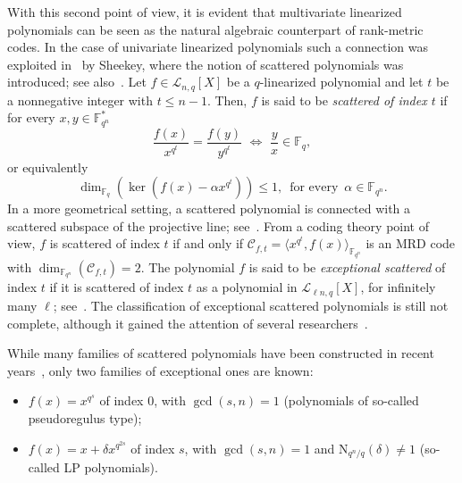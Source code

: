 With this second point of view, it is evident that multivariate linearized polynomials can be seen as the natural algebraic counterpart of rank-metric codes. In the case of univariate linearized polynomials such a connection was exploited in~\cite{sheekey2016new} by Sheekey, where the notion of scattered polynomials was introduced; see also~\cite{bartoli2018exceptional}. Let $f \in \mathcal{L}_{n,q}[X]$ be a $q$-linearized polynomial and let $t$ be a nonnegative integer with $t\leq n-1$. Then, $f$ is said to be \emph{scattered of index $t$} if for every $x,y \in \mathbb{F}_{q^n}^*$
\[ \frac{f(x)}{x^{q^t}}=\frac{f(y)}{y^{q^t}}\,\, \Longleftrightarrow\,\, \frac{y}x\in \mathbb{F}_q, \]
or equivalently
\begin{equation*} \dim_{\mathbb{F}_q}(\ker(f(x)-\alpha x^{q^t}))\leq 1, \,\,\,\text{for every}\,\,\, \alpha \in \mathbb{F}_{q^n}. \end{equation*}
In a more geometrical setting, a scattered polynomial is connected with a scattered subspace of the projective line; see~\cite{blokhuis2000scattered}. From a coding theory point of view,  $f$ is scattered of index $t$ if and only if $\mathcal{C}_{f,t}=\langle x^{q^t}, f(x) \rangle_{\mathbb{F}_{q^n}}$ is an MRD code with $\dim_{\mathbb{F}_{q^n}}(\mathcal{C}_{f,t})=2$.
The polynomial $f$ is said to be \emph{exceptional scattered} of index $t$ if it is scattered of index $t$ as a polynomial in $\mathcal{L}_{\ell n,q}[X]$, for infinitely many $\ell$; see~\cite{bartoli2018exceptional}. The classification of exceptional scattered polynomials is still not complete, although it gained the attention of several researchers~\cite{Bartoli:2020aa4,bartoli2018exceptional,MR4190573,MR4163074,bartoli2022towards}.

While many families of scattered polynomials have been constructed in recent years~\cite{sheekey2016new,lunardon2018generalized,lunardon2000blocking,zanella2019condition,MR4173668,longobardi2021linear,longobardi2023large,NPZ,zanella2020vertex,csajbok2018new,csajbok2018new2,marino2020mrd,blokhuis2000scattered}, only two families of exceptional ones are known:
\begin{itemize}
    \item[(Ps)] $f(x)=x^{q^s}$ of index $0$, with $\gcd(s,n)=1$ (polynomials of so-called pseudoregulus type);
    \item[(LP)] $f(x)=x+\delta x^{q^{2s}}$ of index $s$, with $\gcd(s,n)=1$ and $\mathrm{N}_{q^n/q}(\delta)\ne1$ (so-called LP polynomials).
\end{itemize}

